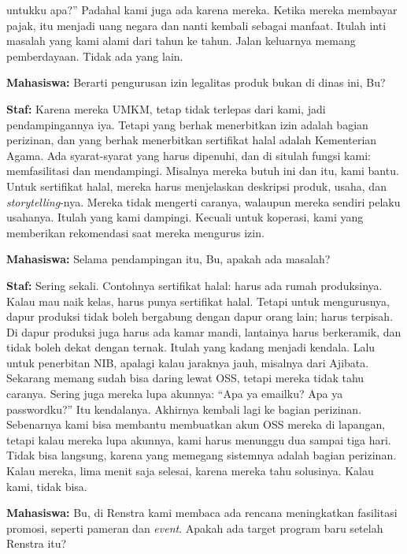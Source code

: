 {untukku apa?'' Padahal kami juga ada karena mereka. Ketika mereka membayar pajak, itu menjadi uang negara dan nanti kembali sebagai manfaat. Itulah inti masalah yang kami alami dari tahun ke tahun. Jalan keluarnya memang pemberdayaan. Tidak ada yang lain.

\noindent \textbf{Mahasiswa:} Berarti pengurusan izin legalitas produk bukan di dinas ini, Bu?

\noindent \textbf{Staf:} Karena mereka UMKM, tetap tidak terlepas dari kami, jadi pendampingannya iya. Tetapi yang berhak menerbitkan izin adalah bagian perizinan, dan yang berhak menerbitkan sertifikat halal adalah Kementerian Agama. Ada syarat-syarat yang harus dipenuhi, dan di situlah fungsi kami: memfasilitasi dan mendampingi. Misalnya mereka butuh ini dan itu, kami bantu. Untuk sertifikat halal, mereka harus menjelaskan deskripsi produk, usaha, dan \textit{storytelling}-nya. Mereka tidak mengerti caranya, walaupun mereka sendiri pelaku usahanya. Itulah yang kami dampingi. Kecuali untuk koperasi, kami yang memberikan rekomendasi saat mereka mengurus izin.

\noindent \textbf{Mahasiswa:} Selama pendampingan itu, Bu, apakah ada masalah?

\noindent \textbf{Staf:} Sering sekali. Contohnya sertifikat halal: harus ada rumah produksinya. Kalau mau naik kelas, harus punya sertifikat halal. Tetapi untuk mengurusnya, dapur produksi tidak boleh bergabung dengan dapur orang lain; harus terpisah. Di dapur produksi juga harus ada kamar mandi, lantainya harus berkeramik, dan tidak boleh dekat dengan ternak. Itulah yang kadang menjadi kendala. Lalu untuk penerbitan NIB, apalagi kalau jaraknya jauh, misalnya dari Ajibata. Sekarang memang sudah bisa daring lewat OSS, tetapi mereka tidak tahu caranya. Sering juga mereka lupa akunnya: ``Apa ya emailku? Apa ya passwordku?'' Itu kendalanya. Akhirnya kembali lagi ke bagian perizinan. Sebenarnya kami bisa membantu membuatkan akun OSS mereka di lapangan, tetapi kalau mereka lupa akunnya, kami harus menunggu dua sampai tiga hari. Tidak bisa langsung, karena yang memegang sistemnya adalah bagian perizinan. Kalau mereka, lima menit saja selesai, karena mereka tahu solusinya. Kalau kami, tidak bisa.

\noindent \textbf{Mahasiswa:} Bu, di Renstra kami membaca ada rencana meningkatkan fasilitasi promosi, seperti pameran dan \textit{event}. Apakah ada target program baru setelah Renstra itu?

}

